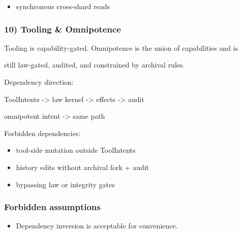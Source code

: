 \documentclass[9pt,a4paper,openany]{book}
\begin{document}
\begin{itemize}
\item synchronous cross-\allowbreak{}shard reads
\end{itemize}





\subsubsection{10) Tooling \& Omnipotence}


Tooling is capability-\allowbreak{}gated.\allowbreak{} Omnipotence is the union of capabilities and is



still law-\allowbreak{}gated, audited, and constrained by archival rules.\allowbreak{}






Dependency direction:



ToolIntents -\allowbreak{}> law kernel -\allowbreak{}> effects -\allowbreak{}> audit



omnipotent intent -\allowbreak{}> same path






Forbidden dependencies:



\begin{itemize}
\item tool-\allowbreak{}side mutation outside ToolIntents
\end{itemize}


\begin{itemize}
\item history edits without archival fork + audit
\end{itemize}


\begin{itemize}
\item bypassing law or integrity gates
\end{itemize}





\subsubsection{Forbidden assumptions}


\begin{itemize}
\item Dependency inversion is acceptable for convenience.\allowbreak{}
\end{itemize}
\end{document}
